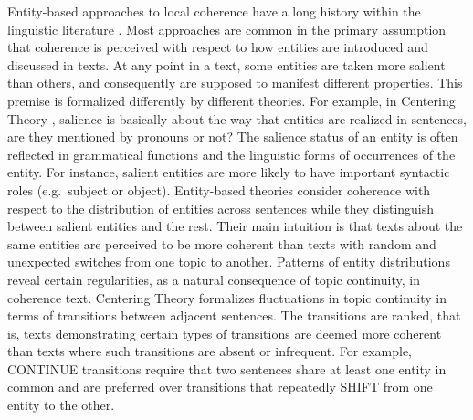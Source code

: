 Entity-based approaches to local coherence have a long history within the linguistic literature \cite{kuno72,halliday76,prince81a,joshi98}.
Most approaches are common in the primary assumption that coherence is perceived with respect to how entities are introduced and discussed in texts. 
At any point in a text, some entities are taken more salient than others, and consequently are supposed to manifest different properties. 
This premise is formalized differently by different theories. 
For example, in Centering Theory \cite{grosz95,joshi98}, salience is basically about the way that entities are realized in sentences, are  they mentioned by pronouns or not? 
The salience status of an entity is often reflected in grammatical functions and the linguistic forms of occurrences of the entity.  
For instance, salient entities are more likely to have important syntactic roles (e.g.\ subject or object). 
Entity-based theories consider coherence with respect to the distribution of entities across sentences while they distinguish between salient entities and the rest. 
Their main intuition is that texts about the same entities are perceived to be more coherent than texts with random and unexpected switches from one topic to another.  
Patterns of entity distributions reveal certain regularities, as a natural consequence of topic continuity, in coherence text. 
Centering Theory formalizes fluctuations in topic continuity in terms of transitions between adjacent sentences. 
The transitions are ranked, that is, texts demonstrating certain types of transitions are deemed more coherent than texts where such transitions are absent or infrequent. 
For example, CONTINUE transitions require that two sentences share at least one entity in common and are preferred over transitions that repeatedly SHIFT from one entity to the other. 


